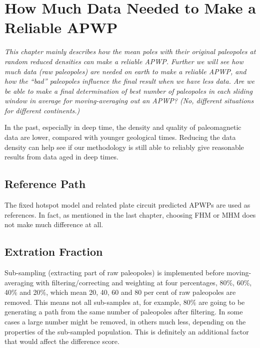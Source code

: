 \chapter{How Much Data Needed to Make a Reliable APWP}\label{chap:DatNeed}
\textit{This chapter mainly describes how the mean poles with their original
paleopoles at random reduced densities can make a reliable APWP\@. Further we
will see how much data (raw paleopoles) are needed on earth to make a reliable
APWP, and how the ``bad'' paleopoles influence the final result when we have
less data. Are we be able to make a final determination of best number of
paleopoles in each sliding window in average for moving-averaging out an APWP?
(No, different situations for different continents.)}
\vfill
\minitoc\newpage

In the past, especially in deep time, the density and quality of paleomagnetic
data are lower, compared with younger geological times. Reducing the data
density can help see if our methodology is still able to reliably give
reasonable results from data aged in deep times.

\section{Reference Path}

The fixed hotspot model and related plate circuit predicted APWPs are used as
references. In fact, as mentioned in the last chapter, choosing FHM or MHM does
not make much difference at all.

\section{Extration Fraction}

Sub-sampling (extracting part of raw paleopoles) is implemented before
moving-averaging with filtering/correcting and weighting at four percentages,
80\%, 60\%, 40\% and 20\%, which mean 20, 40, 60 and 80 per cent of raw
paleopoles are removed. This means not all sub-samples at, for example, 80\%
are going to be generating a path from the same number of paleopoles after
filtering. In some cases a large number might be removed, in others much less,
depending on the properties of the sub-sampled population. This is definitely an
additional factor that would affect the difference score.


